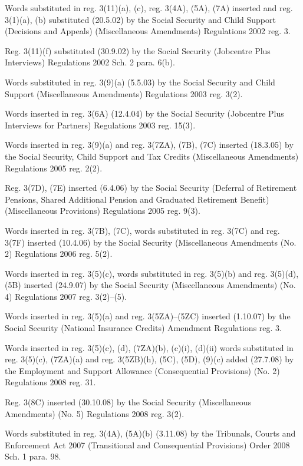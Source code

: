\documentclass[12pt,a4paper]{article}
\begin{document}
{Words substituted in reg. 3(11)(a), (c), reg. 3(4A), (5A), (7A) inserted and reg. 3(1)(a), (b) substituted (20.5.02) by the Social Security and Child Support (Decisions and Appeals) (Miscellaneous Amendments) Regulations 2002 reg. 3.

Reg. 3(11)(f) substituted (30.9.02) by the Social Security (Jobcentre Plus Interviews) Regulations 2002 Sch. 2 para. 6(b).

Words substituted in reg. 3(9)(a) (5.5.03) by the Social Security and Child Support (Miscellaneous Amendments) Regulations 2003 reg. 3(2).

Words inserted in reg. 3(6A) (12.4.04) by the Social Security (Jobcentre Plus Interviews for Partners) Regulations 2003 reg. 15(3).

Words inserted in reg. 3(9)(a) and reg. 3(7ZA), (7B), (7C) inserted (18.3.05) by the Social Security, Child Support and Tax Credits (Miscellaneous Amendments) Regulations 2005 reg. 2(2).

Reg. 3(7D), (7E) inserted (6.4.06) by the Social Security (Deferral of Retirement Pensions, Shared Additional Pension and Graduated Retirement Benefit) (Miscellaneous Provisions) Regulations 2005 reg. 9(3).

Words inserted in reg. 3(7B), (7C), words substituted in reg. 3(7C) and reg. 3(7F) inserted (10.4.06) by the Social Security (Miscellaneous Amendments (No. 2) Regulations 2006 reg. 5(2).

Words inserted in reg. 3(5)(c), words substituted in reg. 3(5)(b) and reg. 3(5)(d), (5B) inserted (24.9.07) by the Social Security (Miscellaneous Amendments) (No. 4) Regulations 2007 reg. 3(2)--(5).

Words inserted in reg. 3(5)(a) and reg. 3(5ZA)--(5ZC) inserted (1.10.07) by the Social Security (National Insurance Credits) Amendment Regulations reg. 3.

Words inserted in reg. 3(5)(c), (d), (7ZA)(b), (c)(i), (d)(ii) words substituted in reg. 3(5)(c), (7ZA)(a) and reg. 3(5ZB)(h), (5C), (5D), (9)(c) added (27.7.08) by the Employment and Support Allowance (Consequential Provisions) (No. 2) Regulations 2008 reg. 31.

Reg. 3(8C) inserted (30.10.08) by the Social Security (Miscellaneous Amendments) (No. 5) Regulations 2008 reg. 3(2).

Words substituted in reg. 3(4A), (5A)(b) (3.11.08) by the Tribunals, Courts and Enforcement Act 2007 (Transitional and Consequential Provisions) Order 2008 Sch. 1 para. 98.

}
\end{document}
